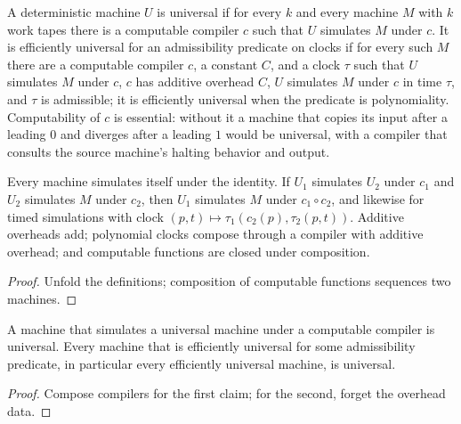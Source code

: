 \begin{definition}
  \label{def:universal}
  \leanok
  A deterministic machine $U$ is universal if for every $k$ and every machine
  $M$ with $k$ work tapes there is a computable compiler $c$ such that $U$
  simulates $M$ under $c$. It is efficiently universal for an admissibility
  predicate on clocks if for every such $M$ there are a computable compiler
  $c$, a constant $C$, and a clock $\tau$ such that $U$ simulates $M$ under
  $c$, $c$ has additive overhead $C$, $U$ simulates $M$ under $c$ in time
  $\tau$, and $\tau$ is admissible; it is efficiently universal when the
  predicate is polynomiality. Computability of $c$ is essential: without it a
  machine that copies its input after a leading $0$ and diverges after a
  leading $1$ would be universal, with a compiler that consults the source
  machine's halting behavior and output.
\end{definition}

\begin{lemma}
  \label{lem:models-simulation-algebra}
  \leanok
  Every machine simulates itself under the identity. If $U_1$ simulates $U_2$
  under $c_1$ and $U_2$ simulates $M$ under $c_2$, then $U_1$ simulates $M$
  under $c_1 \circ c_2$, and likewise for timed simulations with clock
  $(p, t) \mapsto \tau_1(c_2(p), \tau_2(p, t))$. Additive overheads add;
  polynomial clocks compose through a compiler with additive overhead; and
  computable functions are closed under composition.
\end{lemma}
\begin{proof}
  \leanok
  Unfold the definitions; composition of computable functions sequences two
  machines.
\end{proof}

\begin{lemma}
  \label{lem:models-universal-transfer}
  \leanok
  A machine that simulates a universal machine under a computable compiler is
  universal. Every machine that is efficiently universal for some
  admissibility predicate, in particular every efficiently universal machine,
  is universal.
\end{lemma}
\begin{proof}
  \leanok
  Compose compilers for the first claim; for the second, forget the overhead
  data.
\end{proof}

